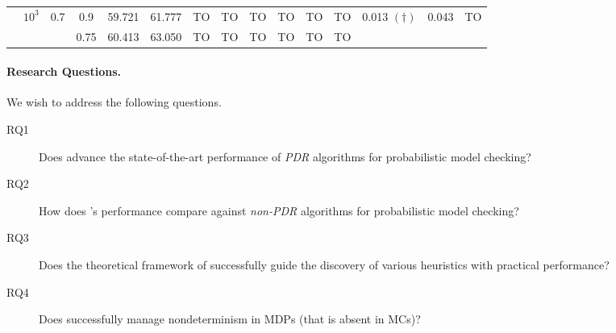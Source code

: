 \begin{sidewaystable}
\begin{lrbox}{\lstbox}
\begin{minipage}{\textheight}
\begin{tabular}{ccccccccccccccc}
				\cmidrule[0.5pt](r){2-15}
				                                               & \multirow{2}{*}{$10^3$}    & \multirow{2}{*}{0.7}      & 0.9                      & 59.721      & 61.777       & TO          & TO       & TO      & TO      & TO      & TO      & \multirow{2}{*}{0.013 $(\dagger)$} & \multirow{2}{*}{0.043}   & \multirow{2}{*}{TO}    \\
				                                               &                            &                           & 0.75                     & 60.413      & 63.050       & TO          & TO       & TO      & TO      & TO      & TO                                                                                               \\
				\bottomrule
			\end{tabular}
		\end{minipage}\end{lrbox}
	\scalebox{.85}{\centering\usebox\lstbox}
\end{sidewaystable}

\paragraph{Research Questions.} We wish to address the following questions.
\begin{description}
	\item[RQ1] Does \ADPDR{} advance the state-of-the-art performance of \emph{PDR} algorithms for probabilistic model checking?
	\item[RQ2] How does \ADPDR{}'s performance compare against \emph{non-PDR} algorithms for probabilistic model checking?
	\item[RQ3] Does the  theoretical framework of \ADPDR{} successfully guide the discovery of various heuristics with practical performance?
	\item[RQ4] Does \ADPDR{} successfully manage nondeterminism in MDPs (that is absent in MCs)?
\end{description}


